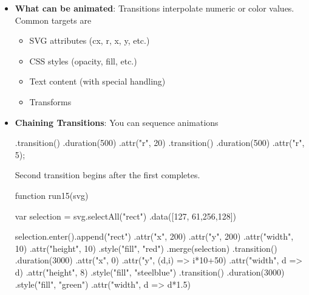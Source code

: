 \documentclass{report}
\begin{document}
\begin{itemize}
\begin{itemize}
                \item \textbf{Duration:} 250 ms (approximate default)
                \item \textbf{Delay:} 0
                \item \textbf{Easing:} cubic in-out
            \end{itemize}
            We have the functions
            \bigbreak \noindent 
            \begin{jscode}
            .duration(ms), .delay(ms), .ease(fn)
            \end{jscode}
            \bigbreak \noindent 
            .ease() takes an ease function, for example d3.easeSin().
        \item \textbf{What can be animated}: Transitions interpolate numeric or color values. Common targets are
            \begin{itemize}
                \item SVG attributes (cx, r, x, y, etc.)
                \item CSS styles (opacity, fill, etc.)
                \item Text content (with special handling)
                \item Transforms
            \end{itemize}
        \item \textbf{Chaining Transitions}: You can sequence animations
            \bigbreak \noindent 
            \begin{jscode}
                .transition()
                .duration(500)
                .attr("r", 20)
                .transition()
                .duration(500)
                .attr("r", 5);
            \end{jscode}
            \bigbreak \noindent 
            Second transition begins after the first completes.
            \bigbreak \noindent 
            \begin{jscode}
                function run15(svg) {
                    var selection = svg.selectAll("rect")
                        .data([127, 61,256,128])

                    selection.enter().append("rect")
                            .attr("x", 200)
                            .attr("y", 200)
                            .attr("width", 10)
                            .attr("height", 10)
                            .style("fill", "red")
                        .merge(selection)
                        .transition()
                        .duration(3000)
                            .attr("x", 0)
                            .attr("y", (d,i) => i*10+50)
                            .attr("width", d => d)
                            .attr("height", 8)
                            .style("fill", "steelblue")
                            .transition()
                            .duration(3000)
                                .style("fill", "green")
                                .attr("width", d => d*1.5)

}
\end{jscode}
\end{itemize}
\end{document}

